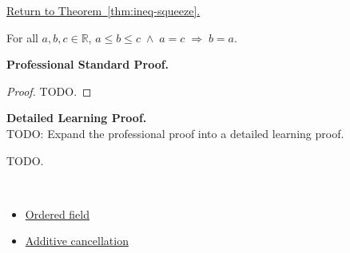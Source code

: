 \newpage
{}
\label{prf:ineq-squeeze}

\begin{remark*}[Return]
\hyperref[thm:ineq-squeeze]{Return to Theorem~\ref*{thm:ineq-squeeze}.}
\end{remark*}

\begin{theorem*}[Squeeze]
For all $a, b, c \in \mathbb{R}$,
$a \le b \le c \;\land\; a = c \;\Rightarrow\; b = a$.
\end{theorem*}

\textbf{Professional Standard Proof.}~\\
\begin{proof}
TODO.
\end{proof}

\textbf{Detailed Learning Proof.}~\\
TODO: Expand the professional proof into a detailed learning proof.


\begin{remark*}
TODO.
\end{remark*}

\begin{remark*}[Dependencies]~\\
\begin{itemize}
  \item \hyperref[def:ordered-field]{Ordered field}
  \item \hyperref[thm:additive-cancellation]{Additive cancellation}
\end{itemize}
\end{remark*}
